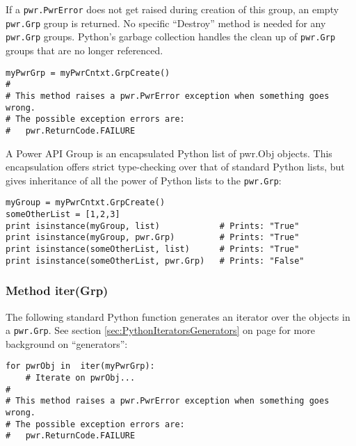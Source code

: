 \documentclass[12pt]{report} %
\begin{document}
\begin{appendices}
If a \texttt{pwr.PwrError} does not get raised during creation of this group,
an empty \texttt{pwr.Grp} group is returned. No specific ``Destroy'' method is
needed for any \texttt{pwr.Grp} groups. Python's garbage collection handles the
clean up of \texttt{pwr.Grp} groups that are no longer referenced.

\begin{center}\begin{minipage}{.95\linewidth}\begin{lstlisting}
myPwrGrp = myPwrCntxt.GrpCreate()
#
# This method raises a pwr.PwrError exception when something goes wrong.
# The possible exception errors are:
#   pwr.ReturnCode.FAILURE
\end{lstlisting}\end{minipage}\end{center}

A Power API Group is an encapsulated Python list of pwr.Obj objects.
This encapsulation offers strict type-checking over that of standard Python
lists, but gives inheritance of all the power of Python lists to the
\texttt{pwr.Grp}:

\begin{center}\begin{minipage}{.95\linewidth}\begin{lstlisting}
myGroup = myPwrCntxt.GrpCreate()
someOtherList = [1,2,3]
print isinstance(myGroup, list)            # Prints: "True"
print isinstance(myGroup, pwr.Grp)         # Prints: "True"
print isinstance(someOtherList, list)      # Prints: "True"
print isinstance(someOtherList, pwr.Grp)   # Prints: "False"
\end{lstlisting}\end{minipage}\end{center}

\subsubsection{Method iter(Grp)} \label{meth:GenerateGroupObjs}

The following standard Python function generates an iterator over the objects
in a \texttt{pwr.Grp}. See section \ref{sec:PythonIteratorsGenerators}
on page \pageref{sec:PythonIteratorsGenerators} for more background on
``generators'':

\begin{center}\begin{minipage}{.95\linewidth}\begin{lstlisting}
for pwrObj in  iter(myPwrGrp):
    # Iterate on pwrObj...
#
# This method raises a pwr.PwrError exception when something goes wrong.
# The possible exception errors are:
#   pwr.ReturnCode.FAILURE
\end{lstlisting}\end{minipage}\end{center}


\end{appendices}
\end{document}
